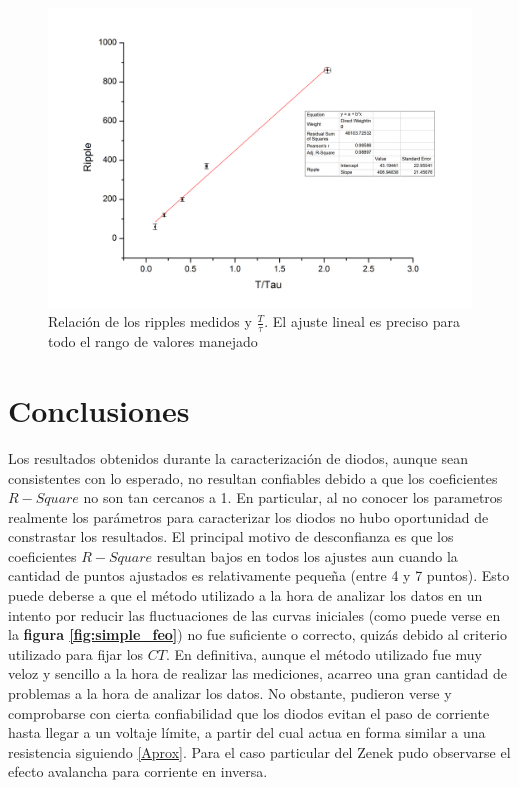 \documentclass[11pt,a4paper]{article}
\begin{document}
\begin{figure}[h]
\centering
\includegraphics[scale=0.37]{completa_lineal}
   \caption{Relación de los ripples medidos y $\frac{T}{\tau}$. El ajuste lineal es preciso para todo el rango de valores manejado}
   \label{fig:completa_lineal}
\end{figure}


\section{Conclusiones}

Los resultados obtenidos durante la caracterización de diodos, aunque sean consistentes con lo esperado, no resultan confiables debido a que los coeficientes $R-Square$ no son tan cercanos a 1. En particular, al no conocer los parametros
realmente los parámetros para caracterizar los diodos no hubo oportunidad de constrastar los resultados. El principal motivo de desconfianza es que los coeficientes $R-Square$ resultan bajos en todos los ajustes aun cuando la cantidad
de puntos ajustados es relativamente pequeña (entre 4 y 7 puntos). Esto puede deberse a que el método utilizado a la hora de analizar los datos en un intento por reducir las fluctuaciones de las curvas iniciales (como puede verse en la 
\textbf{figura \ref{fig:simple_feo}}) no fue suficiente o correcto, quizás debido al criterio utilizado para fijar los $CT$. En definitiva, aunque el método utilizado fue muy veloz y sencillo a la hora de realizar las mediciones, acarreo
una gran cantidad de problemas a la hora de analizar los datos. No obstante, pudieron verse y comprobarse con cierta confiabilidad que los diodos evitan el paso de corriente hasta llegar a un voltaje límite, a partir del cual actua en
forma similar a una resistencia siguiendo \eqref{Aprox}. Para el caso particular del Zenek pudo observarse el efecto avalancha para corriente en inversa.
\end{document}

